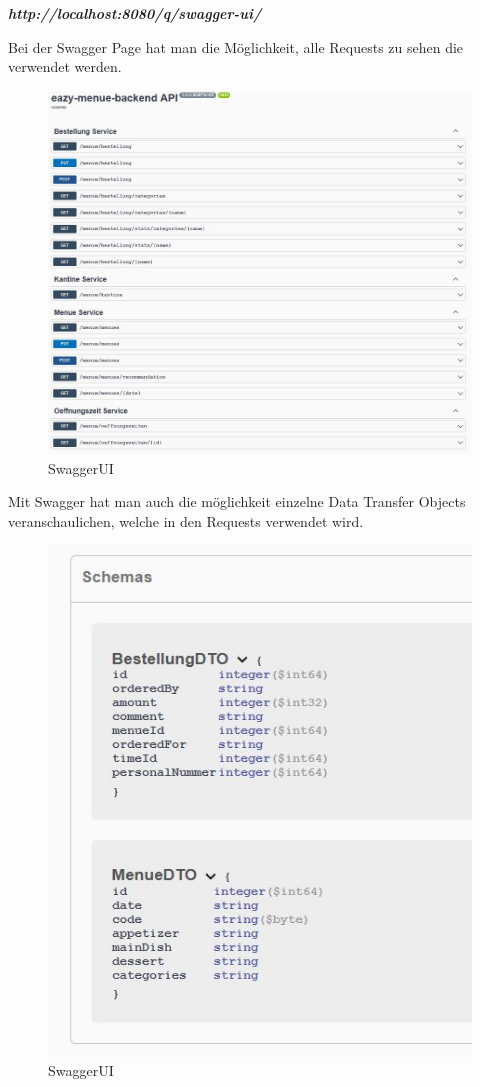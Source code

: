 \textbf{\textit{http://localhost:8080/q/swagger-ui/ }}

\pagebreak

Bei der Swagger Page hat man die Möglichkeit, alle Requests zu sehen die verwendet werden.

\begin{figure}[htp]
    \author{David Ignjatovic}
    \centering
    \includegraphics[scale=0.60]{pics/swagger.jpg}
    \caption{SwaggerUI}
    \label{fig:impl:swagger}
\end{figure}

\pagebreak

Mit Swagger hat man auch die möglichkeit einzelne Data Transfer Objects veranschaulichen, welche in den Requests verwendet wird.

\begin{figure}[htp]
    \author{David Ignjatovic}
    \centering
    \includegraphics[scale=0.90]{pics/swagger-schema.jpg}
    \caption{SwaggerUI}
    \label{fig:impl:swagger-schema}
\end{figure}





